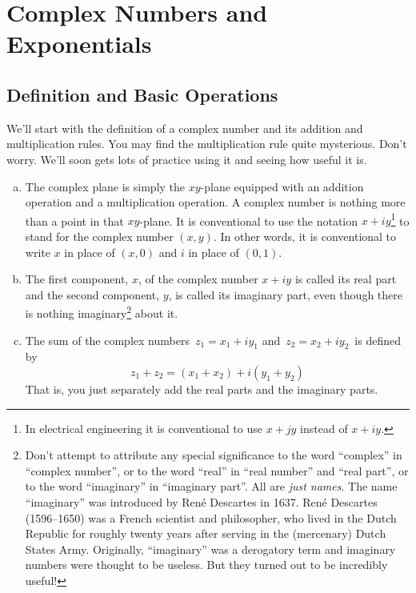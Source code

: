 
\graphicspath{{figures/complex/}}


\chapter{Complex Numbers and Exponentials}\label{ap:complex}
 
\section{Definition and Basic Operations}\label{sec complex defn}
We'll start with the definition of a complex number and its addition and multiplication rules. You may find the multiplication rule quite mysterious. Don't worry. We'll soon gets lots of practice using it 
and seeing how useful it is.
\begin{defn}\label{def complex}
\begin{enumerate}[(a)]
\item
The complex plane is simply the $xy$-plane equipped with an addition operation and a multiplication operation.
A complex number is nothing more than a point in that $xy$-plane.
 It is conventional to use the notation $x+iy$\footnote{In electrical engineering it is conventional to use $x+jy$ instead of $x+iy$.}
to stand for the complex number $(x,y)$. In other words, it is conventional
to write $x$ in place of $(x,0)$ and $i$ in place of $(0,1)$.
\item
 The first component, $x$, of the complex number $x+iy$
is called its real part and the second component, $y$, is called its 
imaginary part, even though there is nothing imaginary\footnote{Don't 
attempt to attribute any special significance to the word ``complex'' in 
``complex number'', or to the word ``real'' in ``real number'' and 
``real part'', or to the word ``imaginary'' in ``imaginary part''. 
All are {\it just names}.
The name ``imaginary'' was introduced by Ren\'e Descartes in 1637. 
Ren\'e Descartes (1596--1650) was a French scientist and philosopher, who 
lived in the Dutch Republic for roughly twenty years after serving in the 
(mercenary) Dutch States Army. Originally, ``imaginary'' was a derogatory term and imaginary numbers were thought to be useless. But they turned out to be incredibly useful!}
 about it.
\item
The sum of the complex numbers $\, z_1=x_1+i y_1 $ and $\, z_2=x_2 +iy_2 \, $ is defined by
\begin{equation*}
z_1+z_2 = (x_1+x_2)+i(y_1+y_2)
\end{equation*}
That is, you just separately add the real parts and the imaginary parts.
\end{enumerate}
\end{defn}

